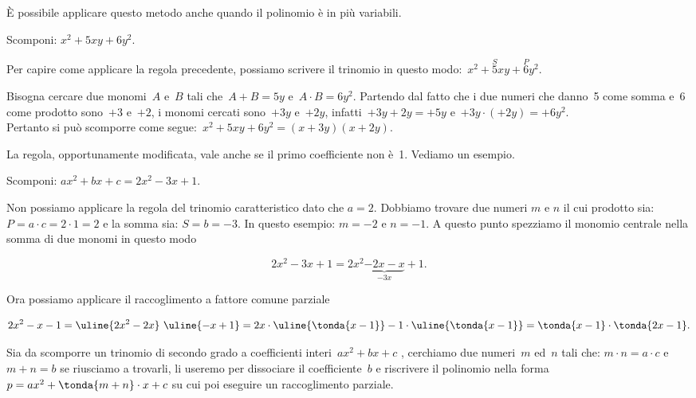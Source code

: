 È possibile applicare questo metodo anche quando il
polinomio è in più variabili.

\begin{esempio}{}{}
Scomponi: \(x^2+5xy+6y^{2}\).

Per capire come applicare la regola precedente, possiamo scrivere il
trinomio in questo modo:~\(x^2+\overset{S}{5}xy+\overset{P}{6}y{^{2}}\).

Bisogna cercare due monomi~\(A\) e~\(B\) tali che~\(A+B=5y\)
e~\(A\cdot B=6y^{2}\). Partendo dal fatto che i due numeri che danno~5
come somma e~6 come prodotto sono~\(+3\) e~\(+2\), i monomi cercati 
sono~\(+3y\) e~\(+2y\), infatti~\(+3y+2y=+5y\) 
e~\(+3y \cdot (+2y) = +6y^{2}\).\\
Pertanto si può scomporre come segue:~\(x^2+5xy+6y^{2}=(x+3y)(x+2y)\).
\end{esempio}

La regola, opportunamente modificata, vale anche se il primo
coefficiente non è~1. Vediamo un esempio.

\begin{esempio}{}{}
Scomponi: \(ax^2+bx+c=2x^2-3x+1\).

Non possiamo applicare la regola del trinomio caratteristico dato che 
\(a=2\).
Dobbiamo trovare due numeri \(m\) e \(n\) il cui prodotto sia: 
\(P = a \cdot c = 2 \cdot 1 = 2\) e la somma sia: \(S = b = -3\).
In questo esempio: \(m = -2\) e \(n = -1\).
A questo punto spezziamo il monomio centrale nella somma di due monomi in 
questo modo

\vspace{-1.0em}
\[2x^2-3x+1=2x^2\underbrace{-2x-x}_{-3x}+1.\]

Ora possiamo applicare il raccoglimento a fattore comune parziale

\vspace{-1.0em}
\[2x^2-x-1=
\uline{2x^2-2x}~\uline{-x+1}=
2x \cdot \uline{\tonda{x-1}}-1 \cdot \uline{\tonda{x-1}}=
\tonda{x-1}\cdot \tonda{2x-1}.\]
\end{esempio}

\begin{procedura}{}{}
Sia da scomporre un trinomio di secondo grado a coefficienti 
interi~\(ax^2+bx+c\)
, cerchiamo due numeri~\(m\) ed~\(n\) tali che: \quad 
\(m \cdot n = a \cdot c\) \quad 
e \quad 
\(m+n=b\)  \quad
se riusciamo a trovarli, li useremo per dissociare
il coefficiente~\(b\) e riscrivere il polinomio nella 
forma~\(p=ax^2+\tonda{m+n}\cdot x+c\)
su cui poi eseguire un raccoglimento parziale.
\end{procedura}


